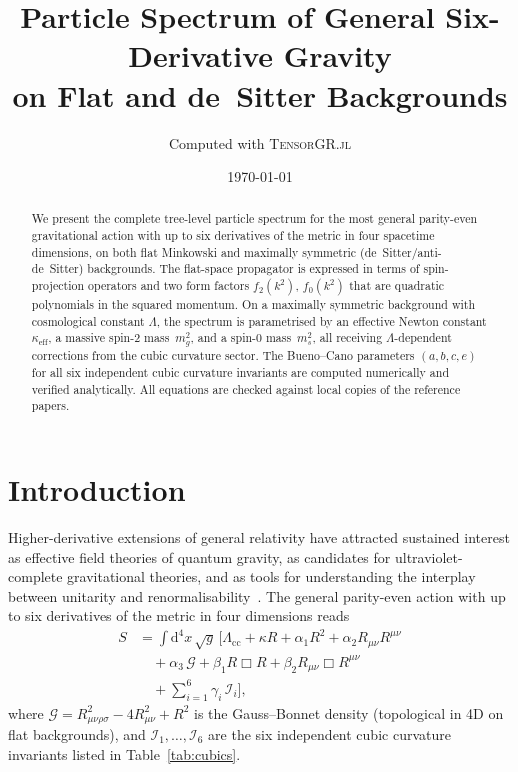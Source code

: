 \documentclass[aps,prd,twocolumn,superscriptaddress,nofootinbib]{revtex4-2}
\newcommand{\dd}{\mathrm{d}}
\newcommand{\TGR}{\textsc{TensorGR.jl}}
\begin{document}
\title{Particle Spectrum of General Six-Derivative Gravity\\
on Flat and de~Sitter Backgrounds}

\author{Computed with \TGR{}}

\date{\today}

\begin{abstract}
We present the complete tree-level particle spectrum for the most general
parity-even gravitational action with up to six derivatives of the metric
in four spacetime dimensions, on both flat Minkowski and maximally symmetric
(de~Sitter/anti-de~Sitter) backgrounds.  The flat-space propagator is
expressed in terms of spin-projection operators and two form factors
$f_2(k^2)$, $f_0(k^2)$ that are quadratic polynomials in the squared
momentum.  On a maximally symmetric background with cosmological constant
$\Lambda$, the spectrum is parametrised by an effective Newton constant
$\kappa_\mathrm{eff}$, a massive spin-2 mass~$m_g^2$, and a spin-0
mass~$m_s^2$, all receiving $\Lambda$-dependent corrections from the
cubic curvature sector.  The Bueno--Cano parameters $(a,b,c,e)$ for all
six independent cubic curvature invariants are computed numerically and
verified analytically.  All equations are checked against local copies
of the reference papers.
\end{abstract}

\maketitle

\section{Introduction}

Higher-derivative extensions of general relativity have attracted
sustained interest as effective field theories of quantum gravity,
as candidates for ultraviolet-complete gravitational theories, and
as tools for understanding the interplay between unitarity and
renormalisability~\cite{Stelle1977,Stelle1978,AsoreyLopezShapiro1997}.
The general parity-even action with up to six derivatives of the metric
in four dimensions reads
\begin{align}\label{eq:action}
S &= \int\!\dd^4x\,\sqrt{g}\,\bigl[
  \Lambda_\mathrm{cc} + \kappa R + \alpha_1 R^2 + \alpha_2 R_{\mu\nu}R^{\mu\nu}
  \nonumber\\
  &\quad + \alpha_3\,\mathcal{G}
  + \beta_1 R\Box R + \beta_2 R_{\mu\nu}\Box R^{\mu\nu}
  \nonumber\\
  &\quad + \sum_{i=1}^{6} \gamma_i\, \mathcal{I}_i
\bigr],
\end{align}
where $\mathcal{G} = R_{\mu\nu\rho\sigma}^2 - 4R_{\mu\nu}^2 + R^2$ is
the Gauss--Bonnet density (topological in 4D on flat backgrounds),
and $\mathcal{I}_1,\ldots,\mathcal{I}_6$ are the six independent cubic
curvature invariants listed in Table~\ref{tab:cubics}.
\end{document}
